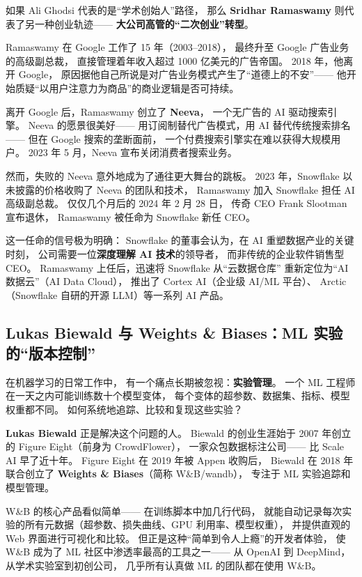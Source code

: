 如果 Ali Ghodsi 代表的是``学术创始人''路径，
那么 \textbf{Sridhar Ramaswamy} 则代表了另一种创业轨迹——
\textbf{大公司高管的``二次创业''转型}。

Ramaswamy 在 Google 工作了 15 年（2003--2018），
最终升至 Google 广告业务的高级副总裁，
直接管理着年收入超过 1000 亿美元的广告帝国。
2018 年，他离开 Google，
原因据他自己所说是对广告业务模式产生了``道德上的不安''——
他开始质疑``以用户注意力为商品''的商业逻辑是否可持续。

离开 Google 后，Ramaswamy 创立了 \textbf{Neeva}，
一个无广告的 AI 驱动搜索引擎。
Neeva 的愿景很美好——
用订阅制替代广告模式，用 AI 替代传统搜索排名——
但在 Google 搜索的垄断面前，
一个付费搜索引擎实在难以获得大规模用户。
2023 年 5 月，Neeva 宣布关闭消费者搜索业务。

然而，失败的 Neeva 意外地成为了通往更大舞台的跳板。
2023 年，Snowflake 以未披露的价格收购了 Neeva 的团队和技术，
Ramaswamy 加入 Snowflake 担任 AI 高级副总裁。
仅仅几个月后的 2024 年 2 月 28 日，
传奇 CEO Frank Slootman 宣布退休，
Ramaswamy 被任命为 Snowflake 新任 CEO。

这一任命的信号极为明确：
Snowflake 的董事会认为，在 AI 重塑数据产业的关键时刻，
公司需要一位\textbf{深度理解 AI 技术}的领导者，
而非传统的企业软件销售型 CEO。
Ramaswamy 上任后，迅速将 Snowflake 从``云数据仓库''
重新定位为``AI 数据云''（AI Data Cloud），
推出了 Cortex AI（企业级 AI/ML 平台）、
Arctic（Snowflake 自研的开源 LLM）等一系列 AI 产品。


\subsection{Lukas Biewald 与 Weights \& Biases：ML 实验的``版本控制''}
\label{subsec:lukas-biewald}

在机器学习的日常工作中，
有一个痛点长期被忽视：\textbf{实验管理}。
一个 ML 工程师在一天之内可能训练数十个模型变体，
每个变体的超参数、数据集、指标、模型权重都不同。
如何系统地追踪、比较和复现这些实验？

\textbf{Lukas Biewald} 正是解决这个问题的人。
Biewald 的创业生涯始于 2007 年创立的 Figure Eight（前身为 CrowdFlower），
一家众包数据标注公司——
比 Scale AI 早了近十年。
Figure Eight 在 2019 年被 Appen 收购后，
Biewald 在 2018 年联合创立了 \textbf{Weights \& Biases}（简称 W\&B/wandb），
专注于 ML 实验追踪和模型管理。

W\&B 的核心产品看似简单——
在训练脚本中加几行代码，
就能自动记录每次实验的所有元数据（超参数、损失曲线、GPU 利用率、模型权重），
并提供直观的 Web 界面进行可视化和比较。
但正是这种``简单到令人上瘾''的开发者体验，
使 W\&B 成为了 ML 社区中渗透率最高的工具之一——
从 OpenAI 到 DeepMind，从学术实验室到初创公司，
几乎所有认真做 ML 的团队都在使用 W\&B。

